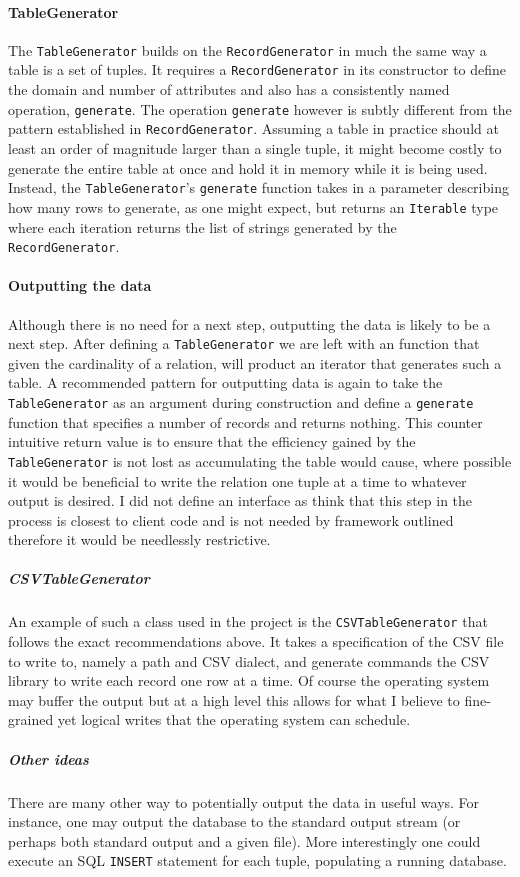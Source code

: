 \paragraph{TableGenerator} The \lstinline{TableGenerator} builds on the
\lstinline{RecordGenerator} in much the same way a table is a set of tuples. It
requires a \lstinline{RecordGenerator} in its constructor to define the domain
and number of attributes and also has a consistently named operation,
\lstinline{generate}. The operation \lstinline{generate} however is subtly
different from the pattern established in \lstinline{RecordGenerator}. Assuming
a table in practice should at least an order of magnitude larger than a single
tuple, it might become costly to generate the entire table at once and hold it
in memory while it is being used. Instead, the \lstinline{TableGenerator}'s
\lstinline{generate} function takes in a parameter describing how many rows to
generate, as one might expect, but returns an \lstinline{Iterable} type where
each iteration returns the list of strings generated by the
\lstinline{RecordGenerator}.

\paragraph{Outputting the data} Although there is no need for a next step,
outputting the data is likely to be a next step. After defining a
\lstinline{TableGenerator} we are left with an function that given the
cardinality of a relation, will product an iterator that generates such a table.
A recommended pattern for outputting data is again to take the
\lstinline{TableGenerator} as an argument during construction and define a
\lstinline{generate} function that specifies a number of records and returns
nothing. This counter intuitive return value is to ensure that the efficiency
gained by the \lstinline{TableGenerator} is not lost as accumulating the table
would cause, where possible it would be beneficial to write the relation one
tuple at a time to whatever output is desired. I did not define an interface as
think that this step in the process is closest to client code and is not needed
by framework outlined therefore it would be needlessly restrictive.
\subparagraph{CSVTableGenerator} An example of such a class used in the project
is the \lstinline{CSVTableGenerator} that follows the exact recommendations
above. It takes a specification of the CSV file to write to, namely a path and
CSV dialect, and generate commands the CSV library to write each record one row
at a time. Of course the operating system may buffer the output but at a high
level this allows for what I believe to fine-grained yet logical writes that the
operating system can schedule.
\subparagraph{Other ideas} There are many other way to potentially output the
data in useful ways. For instance, one may output the database to the standard
output
stream (or perhaps both standard output and a given file). More interestingly one could execute an SQL \lstinline{INSERT}
statement for each tuple, populating a running database.

